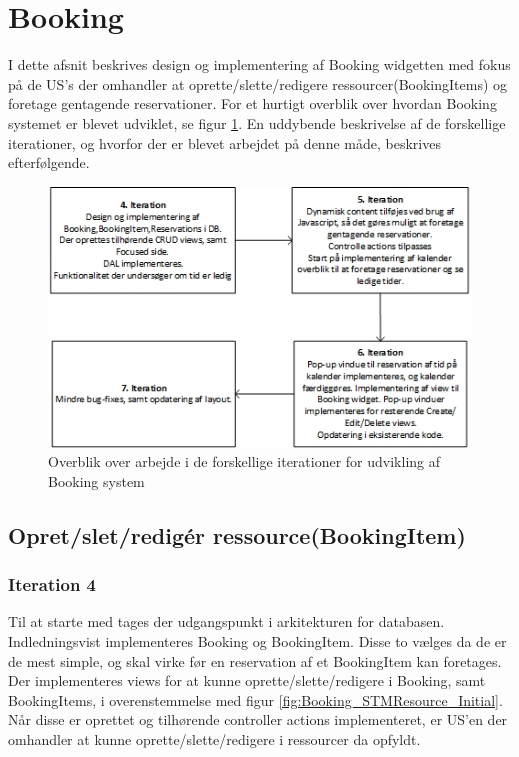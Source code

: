 \section{Booking}
I dette afsnit beskrives design og implementering af Booking widgetten med fokus på de US's der omhandler at oprette/slette/redigere ressourcer(BookingItems) og foretage gentagende reservationer. For et hurtigt overblik over hvordan Booking systemet er blevet udviklet, se figur \ref{fig:Booking_Iterationer}. En uddybende beskrivelse af de forskellige iterationer, og hvorfor der er blevet arbejdet på denne måde, beskrives efterfølgende. 

\begin{figure}[H]
  \includegraphics[width=0.8\linewidth]{01_Billeder/10_Design_og_implementering/Booking/Iterationer.jpg}
  \centering
  \caption{Overblik over arbejde i de forskellige iterationer for udvikling af Booking system}
  \label{fig:Booking_Iterationer}
\end{figure} 

\subsection{Opret/slet/redigér ressource(BookingItem)}
\subsubsection{Iteration 4}
Til at starte med tages der udgangspunkt i arkitekturen for databasen. Indledningsvist implementeres Booking og BookingItem. Disse to vælges da de er de mest simple, og skal virke før en reservation af et BookingItem kan foretages. Der implementeres views for at kunne oprette/slette/redigere i Booking, samt BookingItems, i overenstemmelse med figur \ref{fig:Booking_STMResource_Initial}. Når disse er oprettet og tilhørende controller actions implementeret, er US'en der omhandler at kunne oprette/slette/redigere i ressourcer da opfyldt.


